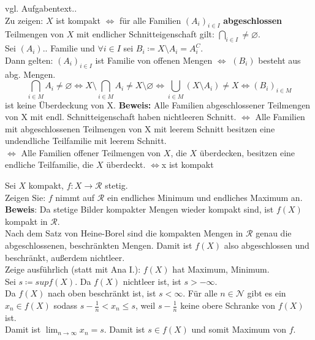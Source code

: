 \begin{problem*}[2]	
vgl. Aufgabentext.. \\
Zu zeigen: $ X $ ist kompakt $ \Longleftrightarrow$ für alle Familien $(A_i)_{ i \in I}$ \textbf{abgeschlossen}
Teilmengen von $ X $ mit endlicher Schnitteigenschaft gilt: $ \bigcap_{ i \in I}  \neq \varnothing$.\\
Sei $ (A_i)..$ Familie und $\forall i \in I$ sei $B_i \coloneqq X \setminus A_i = A_i^{C}$.\\
Dann gelten: 
	$(A_i)_ { i \in I}$ ist Familie von offenen Mengen $\Longleftrightarrow$ $(B_i)$ besteht aus abg. Mengen.
	\begin{equation*}
		\bigcap_{ i \in M} A_i \neq \varnothing \Leftrightarrow X \setminus \bigcap_{ i \in M} A_i \neq	X \setminus \varnothing \Leftrightarrow \bigcup_ {i \in M} (X \setminus A_i) \neq X \Longleftrightarrow (B_i)_{ i \in M }  
	\end{equation*}
	ist keine Überdeckung von X.
	\textbf{Beweis: } Alle Familien abgeschlossener Teilmengen von X mit endl. Schnitteigenschaft haben nichtleeren Schnitt. $\Leftrightarrow$ Alle Familien mit abgeschlossenen Teilmengen von X mit leerem Schnitt besitzen eine undendliche Teilfamilie mit leerem Schnitt. \\
	$\Leftrightarrow$ Alle Familien offener Teilmengen von $ X $, die $ X $ überdecken, besitzen eine endliche Teilfamilie, die $ X $ überdeckt. $\Longleftrightarrow $x ist kompakt
\end{problem*}

\begin{problem*}[3]
Sei $ X $ kompakt, $ f: X \to \mathcal{R}$ stetig.\\
Zeigen Sie: $ f $ nimmt auf $ \mathcal{R} $ ein endliches Minimum und endliches Maximum an.\\
\textbf{Beweis}: Da stetige Bilder kompakter Mengen wieder kompakt sind, ist $f(X)$ kompakt in $\mathcal{R}$.\\
Nach dem Satz von Heine-Borel sind die kompakten Mengen in $\mathcal{R}$ genau die abgeschlossenen, beschränkten Mengen. Damit ist $ f(X) $ also abgeschlossen und beschränkt, außerdem nichtleer.\\
Zeige ausführlich (statt mit Ana I.): $ f(X) $ hat Maximum, Minimum.\\
Sei $ s \coloneqq sup f(X)$. Da $ f(X) $ nichtleer ist, ist $ s > - \infty$.\\
Da $ f(X) $ nach oben beschränkt  ist, ist $ s < \infty$.
Für alle $n \in \mathcal{N}$ gibt es ein $x_n \in f(X)$ sodass $s - \frac{1}{n} < x_n \leq s$, weil $s - \frac{1}{n}$ keine obere Schranke von $ f(X) $ ist.\\
Damit ist $\lim_{ n \rightarrow \infty } x_n = s$. Damit ist $s \in f(X) $ und somit Maximum von $ f $.\\
\end{problem*}

